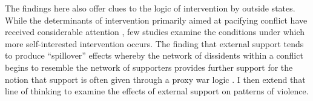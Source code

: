 The findings here also offer clues to the logic of intervention by outside states. While the determinants of intervention primarily aimed at pacifying conflict have received considerable attention \citep[e.g.][]{Regan2000a}, few studies examine the conditions under which more self-interested intervention occurs. The finding that external support tends to produce ``spillover'' effects whereby the network of dissidents within a conflict begins to resemble the network of supporters provides further support for the notion that support is often given through a proxy war logic \citep[see][]{Salehyan2010}. I then extend that line of thinking to examine the effects of external support on patterns of violence.
